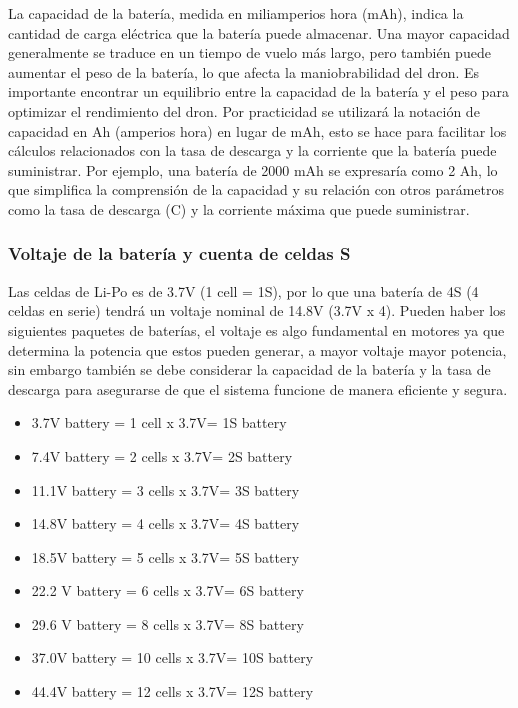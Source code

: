 \documentclass[pdflatex,sn-mathphys-num]{sn-jnl}%
\begin{document}
La capacidad de la batería, medida en miliamperios hora (mAh), indica la cantidad de carga eléctrica que la batería puede almacenar. Una mayor capacidad generalmente se traduce en un tiempo de vuelo más largo, pero también puede aumentar el peso de la batería, lo que afecta la maniobrabilidad del dron. Es importante encontrar un equilibrio entre la capacidad de la batería y el peso para optimizar el rendimiento del dron.
Por practicidad se utilizará la notación de capacidad en Ah (amperios hora) en lugar de mAh, esto se hace para facilitar los cálculos relacionados con la tasa de descarga y la corriente que la batería puede suministrar. Por ejemplo, una batería de 2000 mAh se expresaría como 2 Ah, lo que simplifica la comprensión de la capacidad y su relación con otros parámetros como la tasa de descarga (C) y la corriente máxima que puede suministrar.
\cite{rogerlipo}

\subsubsection{Voltaje de la batería y cuenta de celdas S}

Las celdas de Li-Po es de 3.7V (1 cell = 1S), por lo que una batería de 4S (4 celdas en serie) tendrá un voltaje nominal de 14.8V (3.7V x 4). Pueden haber los siguientes paquetes de baterías, el voltaje es algo fundamental en motores ya que determina la potencia que estos pueden generar, a mayor voltaje mayor potencia, sin embargo también se debe considerar la capacidad de la batería y la tasa de descarga para asegurarse de que el sistema funcione de manera eficiente y segura.
\cite{gensacelipo}
\begin{itemize}
\item 3.7V battery = 1 cell x 3.7V= 1S battery
\item 7.4V battery = 2 cells x 3.7V= 2S battery
\item 11.1V battery = 3 cells x 3.7V= 3S battery
\item 14.8V battery = 4 cells x 3.7V= 4S battery
\item 18.5V battery = 5 cells x 3.7V= 5S battery
\item 22.2 V battery = 6 cells x 3.7V= 6S battery
\item 29.6 V battery = 8 cells x 3.7V= 8S battery
\item 37.0V battery = 10 cells x 3.7V= 10S battery
\item 44.4V battery = 12 cells x 3.7V= 12S battery
\end{itemize}
\end{document}
